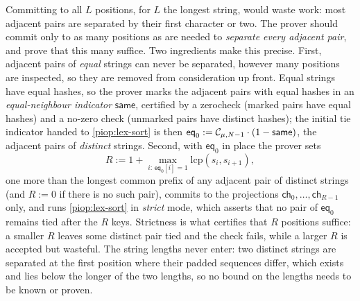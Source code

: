 Committing to all $L$ positions, for $L$ the longest string, would waste work: most adjacent pairs are separated by their first character or two. The prover should commit only to as many positions as are needed to \emph{separate every adjacent pair}, and prove that this many suffice. Two ingredients make this precise. First, adjacent pairs of \emph{equal} strings can never be separated, however many positions are inspected, so they are removed from consideration up front. Equal strings have equal hashes, so the prover marks the adjacent pairs with equal hashes in an \emph{equal-neighbour indicator} $\mathsf{same}$, certified by a zerocheck (marked pairs have equal hashes) and a no-zero check (unmarked pairs have distinct hashes); the initial tie indicator handed to \cref{piop:lex-sort} is then $\mathsf{eq}_0 := \mathcal{C}_{\mu,N-1} \cdot (1 - \mathsf{same})$, the adjacent pairs of \emph{distinct} strings. Second, with $\mathsf{eq}_0$ in place the prover sets
\begin{displaymath}
  R := 1 + \max_{i :\, \mathsf{eq}_0[i] = 1} \mathrm{lcp}(s_i, s_{i+1}),
\end{displaymath}
one more than the longest common prefix of any adjacent pair of distinct strings (and $R := 0$ if there is no such pair), commits to the projections $\mathsf{ch}_0, \dots, \mathsf{ch}_{R-1}$ only, and runs \cref{piop:lex-sort} in \emph{strict} mode, which asserts that no pair of $\mathsf{eq}_0$ remains tied after the $R$ keys. Strictness is what certifies that $R$ positions suffice: a smaller $R$ leaves some distinct pair tied and the check fails, while a larger $R$ is accepted but wasteful. The string lengths never enter: two distinct strings are separated at the first position where their padded sequences differ, which exists and lies below the longer of the two lengths, so no bound on the lengths needs to be known or proven.

